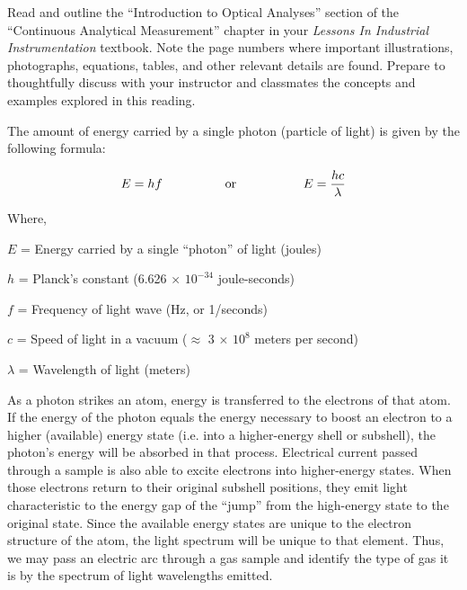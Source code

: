 
Read and outline the ``Introduction to Optical Analyses'' section of the ``Continuous Analytical Measurement'' chapter in your {\it Lessons In Industrial Instrumentation} textbook.  Note the page numbers where important illustrations, photographs, equations, tables, and other relevant details are found.  Prepare to thoughtfully discuss with your instructor and classmates the concepts and examples explored in this reading.













The amount of energy carried by a single photon (particle of light) is given by the following formula:

$$E = hf \hbox{\hskip 50pt or \hskip 50pt} E = {hc \over \lambda}$$

\noindent
Where,

$E$ = Energy carried by a single ``photon'' of light (joules)

$h$ = Planck's constant (6.626 $\times$ $10^{-34}$ joule-seconds)

$f$ = Frequency of light wave (Hz, or 1/seconds)

$c$ = Speed of light in a vacuum ($\approx$ 3 $\times$ $10^8$ meters per second)

$\lambda$ = Wavelength of light (meters)

\vskip 10pt

As a photon strikes an atom, energy is transferred to the electrons of that atom.  If the energy of the photon equals the energy necessary to boost an electron to a higher (available) energy state (i.e. into a higher-energy shell or subshell), the photon's energy will be absorbed in that process.  Electrical current passed through a sample is also able to excite electrons into higher-energy states.  When those electrons return to their original subshell positions, they emit light characteristic to the energy gap of the ``jump'' from the high-energy state to the original state.  Since the available energy states are unique to the electron structure of the atom, the light spectrum will be unique to that element.  Thus, we may pass an electric arc through a gas sample and identify the type of gas it is by the spectrum of light wavelengths emitted.

